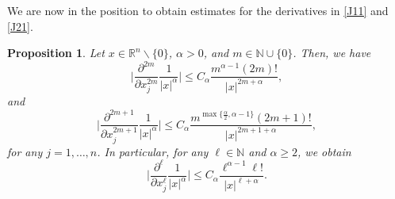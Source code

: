 \documentclass[reqno,11pt]{amsart}
\newtheorem{proposition}[theorem]{Proposition}
\theoremstyle{definition}
\def\R{\mathbb{R}}
\begin{document}
We are now in the position to obtain estimates for the derivatives in \eqref{J11} and \eqref{J21}.
\begin{proposition}\label{CORestimatemodulus}
	Let $x\in \R^n\backslash \{0\}$, $\alpha>0$, and  $m\in \mathbb{N}\cup\{0\}$. Then, we have
	\[
	\bigg|\frac{\partial^{2m}}{\partial x_j^{2m}}\frac{1}{|x|^{\alpha}}\bigg| \leq C_\alpha \frac{m^{\alpha-1} (2m)!}{|x|^{2m+\alpha}},
	\]
	and
	\[
	\bigg| \frac{\partial^{2m+1}}{\partial x_j^{2m+1}}\frac{1}{|x|^{\alpha}} \bigg|\leq C_\alpha \frac{m^{\max\{\frac{\alpha}{2},\alpha-1\}} (2m+1)!}{|x|^{2m+1+\alpha}},
	\]
	for any $j=1,\ldots ,n$. In particular, for any $\ell\in \mathbb{N}$ and $\alpha\geq 2$, we obtain
	\begin{equation}
		\label{EQuniversalestmodulus}
		\bigg| \frac{\partial^{\ell}}{\partial x_j^{\ell}}\frac{1}{|x|^{\alpha}} \bigg| \leq C_\alpha \frac{\ell^{\alpha-1}\ell!}{|x|^{\ell+\alpha}}.
	\end{equation}
\end{proposition}
\end{document}
